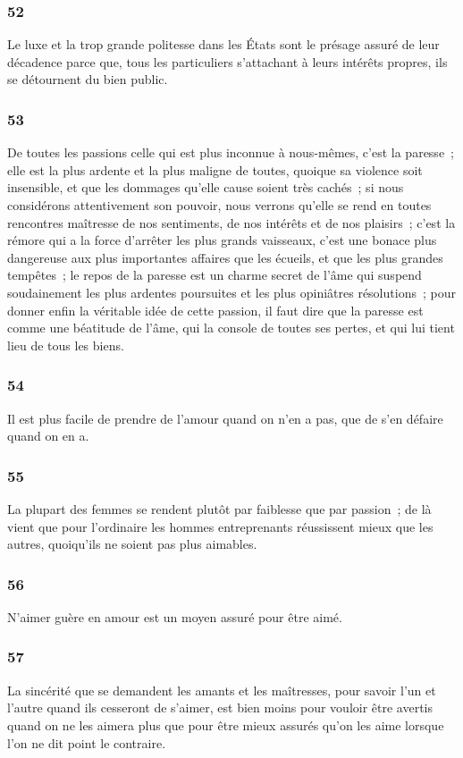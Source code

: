 \documentclass[french,twoside]{book} %
\begin{document}
\subsubsection[{52}]{ \textsc{52} }
\noindent Le luxe et la trop grande politesse dans les États sont le présage assuré de leur décadence parce que, tous les particuliers s’attachant à leurs intérêts propres, ils se détournent du bien public.
\subsubsection[{53}]{ \textsc{53} }
\noindent De toutes les passions celle qui est plus inconnue à nous-mêmes, c’est la paresse ; elle est la plus ardente et la plus maligne de toutes, quoique sa violence soit insensible, et que les dommages qu’elle cause soient très cachés ; si nous considérons attentivement son pouvoir, nous verrons qu’elle se rend en toutes rencontres maîtresse de nos sentiments, de nos intérêts et de nos plaisirs ; c’est la rémore qui a la force d’arrêter les plus grands vaisseaux, c’est une bonace plus dangereuse aux plus importantes affaires que les écueils, et que les plus grandes tempêtes ; le repos de la paresse est un charme secret de l’âme qui suspend soudainement les plus ardentes poursuites et les plus opiniâtres résolutions ; pour donner enfin la véritable idée de cette passion, il faut dire que la paresse est comme une béatitude de l’âme, qui la console de toutes ses pertes, et qui lui tient lieu de tous les biens.
\subsubsection[{54}]{ \textsc{54} }
\noindent Il est plus facile de prendre de l’amour quand on n’en a pas, que de s’en défaire quand on en a.
\subsubsection[{55}]{ \textsc{55} }
\noindent La plupart des femmes se rendent plutôt par faiblesse que par passion ; de là vient que pour l’ordinaire les hommes entreprenants réussissent mieux que les autres, quoiqu’ils ne soient pas plus aimables.
\subsubsection[{56}]{ \textsc{56} }
\noindent N’aimer guère en amour est un moyen assuré pour être aimé.
\subsubsection[{57}]{ \textsc{57} }
\noindent La sincérité que se demandent les amants et les maîtresses, pour savoir l’un et l’autre quand ils cesseront de s’aimer, est bien moins pour vouloir être avertis quand on ne les aimera plus que pour être mieux assurés qu’on les aime lorsque l’on ne dit point le contraire.
\end{document}
